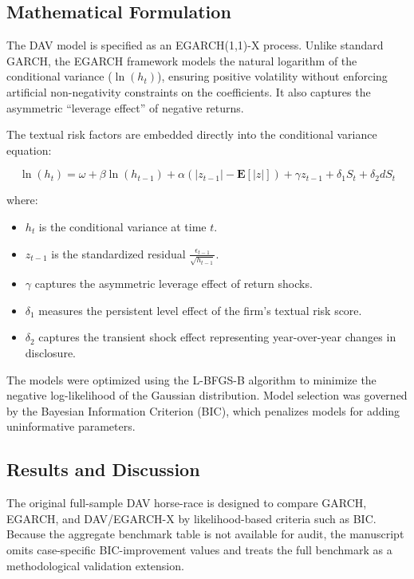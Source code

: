 \documentclass[11pt, a4paper]{article}
\begin{document}
\subsection{Mathematical Formulation}
The DAV model is specified as an EGARCH(1,1)-X process. Unlike standard GARCH, the EGARCH framework models the natural logarithm of the conditional variance ($\ln(h_t)$), ensuring positive volatility without enforcing artificial non-negativity constraints on the coefficients. It also captures the asymmetric ``leverage effect'' of negative returns.

The textual risk factors are embedded directly into the conditional variance equation:

\begin{equation}
\ln(h_t) = \omega + \beta \ln(h_{t-1}) + \alpha (|z_{t-1}| - \mathbf{E}[|z|]) + \gamma z_{t-1} + \delta_1 S_t + \delta_2 dS_t
\end{equation}

where:
\begin{itemize}
    \item $h_t$ is the conditional variance at time $t$.
    \item $z_{t-1}$ is the standardized residual $\frac{\epsilon_{t-1}}{\sqrt{h_{t-1}}}$.
    \item $\gamma$ captures the asymmetric leverage effect of return shocks.
    \item $\delta_1$ measures the persistent level effect of the firm's textual risk score.
    \item $\delta_2$ captures the transient shock effect representing year-over-year changes in disclosure.
\end{itemize}

The models were optimized using the L-BFGS-B algorithm to minimize the negative log-likelihood of the Gaussian distribution. Model selection was governed by the Bayesian Information Criterion (BIC), which penalizes models for adding uninformative parameters.

\subsection{Results and Discussion}
The original full-sample DAV horse-race is designed to compare GARCH, EGARCH, and DAV/EGARCH-X by likelihood-based criteria such as BIC. Because the aggregate benchmark table is not available for audit, the manuscript omits case-specific BIC-improvement values and treats the full benchmark as a methodological validation extension.
\end{document}
